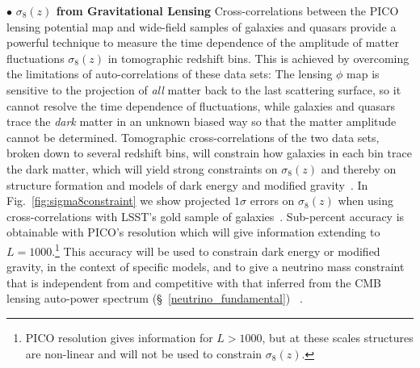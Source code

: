 \documentclass[PICOReport.tex]{subfiles}
\begin{document}
\noindent$\bullet$ {\bf $\sigma_{8}(z)$ from Gravitational Lensing} \hspace{0.1in} \label{sigma8_lensing}
Cross-correlations between the PICO lensing potential map and wide-field samples of galaxies and quasars provide a powerful technique to measure the time dependence of the amplitude of matter fluctuations $\sigma_{8}(z)$ in tomographic redshift bins. This is achieved by overcoming the limitations of auto-correlations of these data sets:
The lensing $\phi$ map is sensitive to the projection of {\it all} matter back to the last scattering surface, so it cannot resolve the time dependence of fluctuations, while galaxies and quasars trace the {\it dark} matter in an unknown biased way so that the matter amplitude cannot be determined.
Tomographic cross-correlations of the two data sets, broken down to several redshift bins, will constrain how galaxies in each bin trace the dark matter, which will yield strong constraints on $\sigma_8(z)$ and thereby on structure formation and models of dark energy and modified gravity~\citep{2009PhRvL.102b1302S,2018PhRvD..97l3540S}.
In Fig.~\ref{fig:sigma8constraint} we show projected $1\sigma$ errors on $\sigma_8(z)$ when using cross-correlations with LSST's gold sample of galaxies~\citep{LSSTScienceBook}.  Sub-percent accuracy is obtainable with PICO's resolution which will give information extending to $L =1000$.\footnote{PICO resolution gives information for $L>1000$, but at these scales structures are non-linear and will not be used to constrain $\sigma_{8}(z)$.} This accuracy will be used to constrain dark energy or modified gravity, in the context of specific models, and to give a neutrino mass constraint that is independent from and competitive with that inferred from the CMB lensing auto-power spectrum (\S~\ref{neutrino_fundamental})~\citep{2018arXiv180902120Y} .
\end{document}
